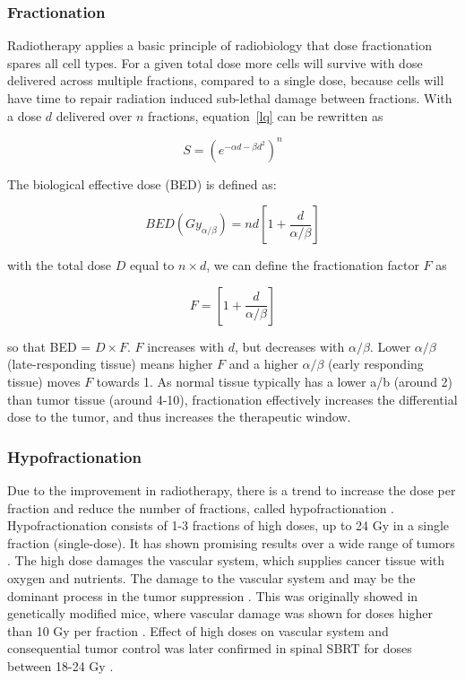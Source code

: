 \subsubsection{Fractionation}

Radiotherapy applies a basic principle of radiobiology that dose fractionation spares all cell types. For a given total dose
more cells will survive with dose delivered across multiple fractions, compared to a single dose, because cells will have time to repair
radiation induced sub-lethal damage between fractions.
With a dose $d$ delivered over $n$ fractions, equation~\ref{lq} can be rewritten as \cite{Shrieve2011}

\begin{equation}
 S = (e^{-\alpha d - \beta d^2})^n
\end{equation}

The biological effective dose (BED) is defined as:

\begin{equation}
 BED(Gy_{\alpha/\beta})=nd\left[1 + \frac{d}{\alpha/\beta} \right]
\end{equation}

with the total dose $D$ equal to $n \times d$, we can define the fractionation factor $F$ as

\begin{equation}
 F = \left[1 + \frac{d}{\alpha / \beta} \right]
\end{equation}

so that BED = $D \times F$. $F$ increases with $d$, but decreases with $\alpha / \beta$. Lower $\alpha / \beta$ (late-responding tissue)
means higher $F$ and a higher $\alpha / \beta$ (early responding tissue) moves $F$ towards 1. 
As normal tissue typically has a lower a/b (around 2) than tumor tissue (around 4-10), fractionation effectively increases the differential dose to the tumor, and thus increases the therapeutic window.


\subsubsection{Hypofractionation}

Due to the improvement in radiotherapy, there is a trend to increase the dose per fraction and reduce the number of fractions, called hypofractionation \cite{Lo2010}.
Hypofractionation consists of 1-3 fractions of high doses, up to 24 Gy in a single fraction (single-dose). It has shown promising results over a wide range of tumors \cite{Yamada2008, Greco2011, Halasz2013}.
The high dose damages the vascular system, which supplies cancer tissue with oxygen and nutrients. The damage to the vascular system and may be the dominant process in the tumor suppression \cite{Fuks2005}.
This was originally showed in genetically modified mice, where vascular damage
was shown for doses higher than 10 Gy per fraction \cite{Garcia2003}. Effect of high doses on vascular system and consequential tumor control was later confirmed in spinal SBRT for doses between 18-24 Gy \cite{Yamada2008}.

